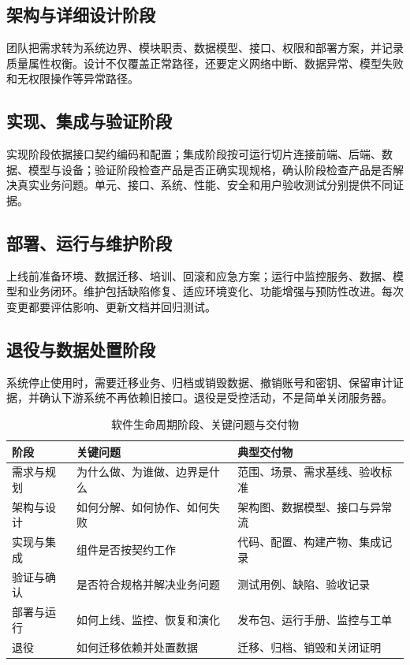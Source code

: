 \subsection{架构与详细设计阶段}

团队把需求转为系统边界、模块职责、数据模型、接口、权限和部署方案，并记录质量属性权衡。设计不仅覆盖正常路径，还要定义网络中断、数据异常、模型失败和无权限操作等异常路径。

\subsection{实现、集成与验证阶段}

实现阶段依据接口契约编码和配置；集成阶段按可运行切片连接前端、后端、数据、模型与设备；验证阶段检查产品是否正确实现规格，确认阶段检查产品是否解决真实业务问题。单元、接口、系统、性能、安全和用户验收测试分别提供不同证据。

\subsection{部署、运行与维护阶段}

上线前准备环境、数据迁移、培训、回滚和应急方案；运行中监控服务、数据、模型和业务闭环。维护包括缺陷修复、适应环境变化、功能增强与预防性改进。每次变更都要评估影响、更新文档并回归测试。

\subsection{退役与数据处置阶段}

系统停止使用时，需要迁移业务、归档或销毁数据、撤销账号和密钥、保留审计证据，并确认下游系统不再依赖旧接口。退役是受控活动，不是简单关闭服务器。

\begin{table}[htbp]
\centering
\caption{软件生命周期阶段、关键问题与交付物}
\label{tab:sdlc-deliverables}
\begin{tabular}{p{2.5cm}p{5.0cm}p{5.1cm}}
\toprule
阶段 & 关键问题 & 典型交付物 \\
\midrule
需求与规划 & 为什么做、为谁做、边界是什么 & 范围、场景、需求基线、验收标准 \\
架构与设计 & 如何分解、如何协作、如何失败 & 架构图、数据模型、接口与异常流 \\
实现与集成 & 组件是否按契约工作 & 代码、配置、构建产物、集成记录 \\
验证与确认 & 是否符合规格并解决业务问题 & 测试用例、缺陷、验收记录 \\
部署与运行 & 如何上线、监控、恢复和演化 & 发布包、运行手册、监控与工单 \\
退役 & 如何迁移依赖并处置数据 & 迁移、归档、销毁和关闭证明 \\
\bottomrule
\end{tabular}
\end{table}

